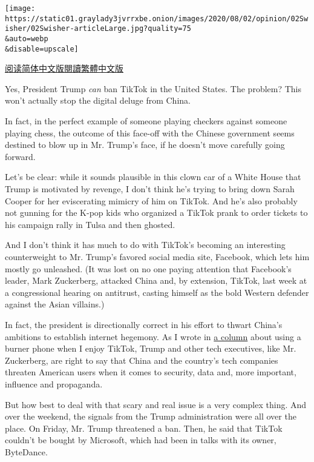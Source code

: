 \texttt{[image: https://static01.graylady3jvrrxbe.onion/images/2020/08/02/opinion/02Swisher/02Swisher-articleLarge.jpg?quality=75\\\&auto=webp\\\&disable=upscale]}

\href{https://cn.nytimes3xbfgragh.onion/opinion/20200804/tik-tok-china-trump/}{阅读简体中文版}\href{https://cn.nytimes3xbfgragh.onion/opinion/20200804/tik-tok-china-trump/zh-hant/}{閱讀繁體中文版}

Yes, President Trump \emph{can} ban TikTok in the United States. The
problem? This won't actually stop the digital deluge from China.

In fact, in the perfect example of someone playing checkers against
someone playing chess, the outcome of this face-off with the Chinese
government seems destined to blow up in Mr. Trump's face, if he doesn't
move carefully going forward.

Let's be clear: while it sounds plausible in this clown car of a White
House that Trump is motivated by revenge, I don't think he's trying to
bring down Sarah Cooper for her eviscerating mimicry of him on TikTok.
And he's also probably not gunning for the K-pop kids who organized a
TikTok prank to order tickets to his campaign rally in Tulsa and then
ghosted.

And I don't think it has much to do with TikTok's becoming an
interesting counterweight to Mr. Trump's favored social media site,
Facebook, which lets him mostly go unleashed. (It was lost on no one
paying attention that Facebook's leader, Mark Zuckerberg, attacked China
and, by extension, TikTok, last week at a congressional hearing on
antitrust, casting himself as the bold Western defender against the
Asian villains.)

In fact, the president is directionally correct in his effort to thwart
China's ambitions to establish internet hegemony. As I wrote in
\href{https://www.nytimes3xbfgragh.onion/2020/07/17/opinion/tiktok-ban-china.html}{a
column} about using a burner phone when I enjoy TikTok, Trump and other
tech executives, like Mr. Zuckerberg, are right to say that China and
the country's tech companies threaten American users when it comes to
security, data and, more important, influence and propaganda.

But how best to deal with that scary and real issue is a very complex
thing. And over the weekend, the signals from the Trump administration
were all over the place. On Friday, Mr. Trump threatened a ban. Then, he
said that TikTok couldn't be bought by Microsoft, which had been in
talks with its owner, ByteDance.

